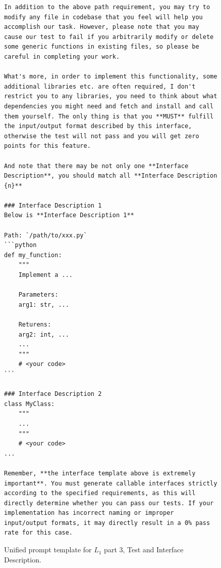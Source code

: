 \documentclass{article}
\begin{document}
\begin{figure}[htbp]
\centering
\begin{tcolorbox}[
    colback=white,
    colframe=black!60,
    coltitle=white,
    colbacktitle=black!60,
    title=User prompt part 3 of 3,
    fonttitle=\bfseries,
    boxrule=0.7pt,
    arc=1mm,
    width=1\linewidth,
]
\begin{lstlisting}[basicstyle=\footnotesize\ttfamily, breaklines=true]
In addition to the above path requirement, you may try to modify any file in codebase that you feel will help you accomplish our task. However, please note that you may cause our test to fail if you arbitrarily modify or delete some generic functions in existing files, so please be careful in completing your work.

What's more, in order to implement this functionality, some additional libraries etc. are often required, I don't restrict you to any libraries, you need to think about what dependencies you might need and fetch and install and call them yourself. The only thing is that you **MUST** fulfill the input/output format described by this interface, otherwise the test will not pass and you will get zero points for this feature.

And note that there may be not only one **Interface Description**, you should match all **Interface Description {n}**

### Interface Description 1
Below is **Interface Description 1**

Path: `/path/to/xxx.py`
```python
def my_function:
    """
    Implement a ...
    
    Parameters:
    arg1: str, ...

    Returens:
    arg2: int, ...
    ...
    """
    # <your code>
```

### Interface Description 2
class MyClass:
    """
    ...
    """
    # <your code>
...

Remember, **the interface template above is extremely important**. You must generate callable interfaces strictly according to the specified requirements, as this will directly determine whether you can pass our tests. If your implementation has incorrect naming or improper input/output formats, it may directly result in a 0% pass rate for this case.

\end{lstlisting}
\end{tcolorbox}
\caption{Unified prompt template for $L_1$ part 3, Test and Interface Description.}
\label{fig:systemprompt3}
\end{figure}
\end{document}
